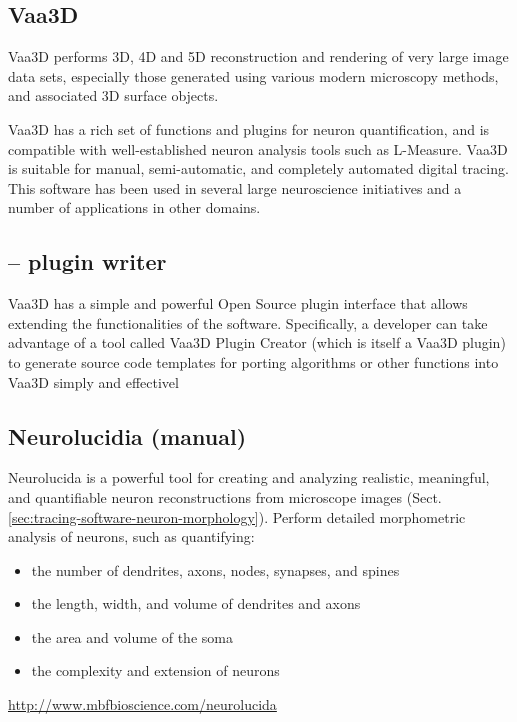 \subsection{Vaa3D}
\label{sec:Vaa3D}

Vaa3D performs 3D, 4D and 5D reconstruction and rendering of very large image
data sets, especially those generated using various modern microscopy methods, and
associated 3D surface objects.

Vaa3D has a rich set of functions and plugins for neuron quantification, and is
compatible with well-established neuron analysis tools such as L-Measure.
Vaa3D is suitable for manual, semi-automatic, and completely automated digital
tracing. This software has been used in several large neuroscience initiatives
and a number of applications in other domains.

\subsection{-- plugin writer}

Vaa3D has a simple and powerful Open Source plugin interface that allows
extending the functionalities of the software. Specifically, a developer can
take advantage of a tool called Vaa3D Plugin Creator (which is itself a Vaa3D
plugin) to generate source code templates for porting algorithms or other
functions into Vaa3D simply and effectivel

\subsection{Neurolucidia (manual)}
\label{sec:Neurolucidia}

Neurolucida is a powerful tool for creating and analyzing realistic, meaningful,
and quantifiable neuron reconstructions from microscope images
(Sect.\ref{sec:tracing-software-neuron-morphology}). Perform detailed
morphometric analysis of neurons, such as quantifying:

\begin{itemize}
  \item  the number of dendrites, axons, nodes, synapses, and spines
  \item the length, width, and volume of dendrites and axons
  \item  the area and volume of the soma
  \item  the complexity and extension of neurons  
\end{itemize}
\url{http://www.mbfbioscience.com/neurolucida}


